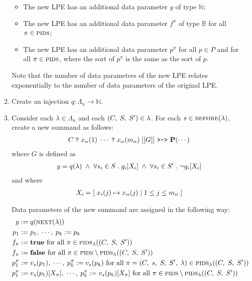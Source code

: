 \begin{enumerate}[1.]
\begin{itemize}
\item The new LPE has an additional data parameter $y$ of type $\mathbb{N}$;
\item The new LPE has an additional data parameter $f^\pi$ of type $\mathbb{B}$ for all $\pi \in \textsc{pids}$;
\item The new LPE has an additional data parameter $p^\pi$ for all $p \in P$ and for all $\pi \in \textsc{pids}$, where the sort of $p^\pi$ is the same as the sort of $p$.
\end{itemize}
Note that the number of data parameters of the new LPE relates exponentially to the number of data parameters of the original LPE.
\item Create an injection $q : \Lambda_n \rightarrow \mathbb{N}$.
\item Consider each $\lambda \in \Lambda_n$ and each $(C,\; S,\; {S}^\prime) \in \lambda$.
For each $s \in \textsc{before}(\lambda)$, create a new summand as follows:
\begin{align*}
C \; \texttt{?} \; x_\alpha(1) \; \cdots \; \texttt{?} \; x_\alpha(m_\alpha) \; [[G]] \text{ \texttt{>->} } \mathbf{P}(\cdots)
\end{align*}
where $G$ is defined as
\begin{align*}
y = q(\lambda) \; \land \; \forall s_i \in S \; .\; g_i[X_i] \; \land \; \forall s_i \in {S}^\prime \; .\; \neg g_i[X_i]
\end{align*}
and where
\begin{align*}
X_i = [\;x_i(j) \mapsto x_\alpha(j)\;|\;1 \leq j \leq m_\alpha\;]
\end{align*}

Data parameters of the new summand are assigned in the following way:
\begin{align*}
y &:= q(\nextESS{\lambda}) \\
p_1 &:= p_1\comma \cdots\comma p_k := p_k \\
f_\pi &:= \mathbf{true} \text{ for all } \pi \in \dataParId{\triple{C}{S}{\primed{S}}}{\lambda} \\
f_\pi &:= \mathbf{false} \text{ for all } \pi \in \dataParIds \setminus \dataParId{\triple{C}{S}{\primed{S}}}{\lambda} \\
p_1^\pi &:= v_s(p_1)\comma \cdots\comma p_k^\pi := v_s(p_k) \text{ for all } \pi = \fiveTuple{C}{s}{S}{\primed{S}}{\lambda} \in \dataParId{\triple{C}{S}{\primed{S}}}{\lambda} \\
p_1^\pi &:= v_s(p_1)[X_\pi]\comma \cdots\comma p_k^\pi := v_s(p_k)[X_\pi] \text{ for all } \pi \in \dataParIds \setminus \dataParId{\triple{C}{S}{\primed{S}}}{\lambda} \\
\end{align*}
\end{enumerate}

